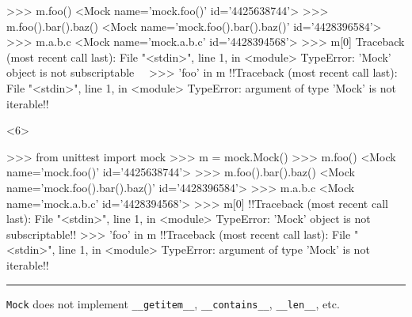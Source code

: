 \documentclass[xcolor={svgnames}]{beamer}
\newcommand{\pycode}[2][]{\lstinline[style=python,#1]{#2}}
\newcommand{\hr}[2]{\vspace{#1}\hrule height 0.01mm\vspace{#2}}
\begin{document}
\begin{frame}[t,fragile]
\begin{onlyenv}
\begin{pyenv}[gobble=12]
            >>> m.foo()
            <Mock name='mock.foo()' id='4425638744'>
            >>> m.foo().bar().baz()
            <Mock name='mock.foo().bar().baz()' id='4428396584'>
            >>> m.a.b.c
            <Mock name='mock.a.b.c' id='4428394568'>
            >>> m[0]
            Traceback (most recent call last):
              File "<stdin>", line 1, in <module>
            TypeError: 'Mock' object is not subscriptable~~
            >>> 'foo' in m
            !!Traceback (most recent call last):
              File "<stdin>", line 1, in <module>
            TypeError: argument of type 'Mock' is not iterable!!
        \end{pyenv}
    \end{onlyenv}
    \begin{onlyenv}<6>
        \begin{pyenv}[gobble=12]
            >>> from unittest import mock
            >>> m = mock.Mock()
            >>> m.foo()
            <Mock name='mock.foo()' id='4425638744'>
            >>> m.foo().bar().baz()
            <Mock name='mock.foo().bar().baz()' id='4428396584'>
            >>> m.a.b.c
            <Mock name='mock.a.b.c' id='4428394568'>
            >>> m[0]
            !!Traceback (most recent call last):
              File "<stdin>", line 1, in <module>
            TypeError: 'Mock' object is not subscriptable!!
            >>> 'foo' in m
            !!Traceback (most recent call last):
              File "<stdin>", line 1, in <module>
            TypeError: argument of type 'Mock' is not iterable!!
        \end{pyenv}
        \hr{-1mm}{-1mm}
        \pycode{Mock} does not implement \pycode{__getitem__},
        \pycode{__contains__}, \pycode{__len__}, etc.
    \end{onlyenv}
\end{frame}
\end{document}
